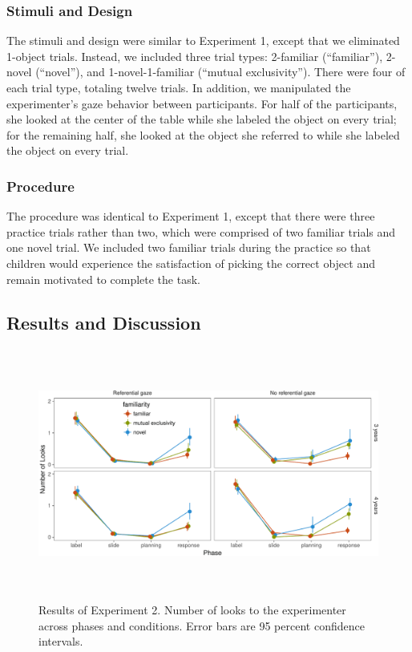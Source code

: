 \documentclass[10pt, letterpaper]{article}
\newenvironment{CodeChunk}{}{}
\begin{document}
\subsubsection{Stimuli and Design}\label{stimuli-and-design-1}

The stimuli and design were similar to Experiment 1, except that we
eliminated 1-object trials. Instead, we included three trial types:
2-familiar (``familiar''), 2-novel (``novel''), and 1-novel-1-familiar
(``mutual exclusivity''). There were four of each trial type, totaling
twelve trials. In addition, we manipulated the experimenter's gaze
behavior between participants. For half of the participants, she looked
at the center of the table while she labeled the object on every trial;
for the remaining half, she looked at the object she referred to while
she labeled the object on every trial.

\subsubsection{Procedure}\label{procedure-1}

The procedure was identical to Experiment 1, except that there were
three practice trials rather than two, which were comprised of two
familiar trials and one novel trial. We included two familiar trials
during the practice so that children would experience the satisfaction
of picking the correct object and remain motivated to complete the task.

\subsection{Results and Discussion}\label{results-and-discussion-1}

\begin{CodeChunk}
\begin{figure}[h]

{\centering \includegraphics[width=6.5in,height=3.25in]{figs/results_e2-1} 

}

\caption[Results of Experiment 2]{Results of Experiment 2. Number of looks to the experimenter across phases and conditions. Error bars are 95 percent confidence intervals.}\label{fig:results_e2}
\end{figure}
\end{CodeChunk}
\end{document}
